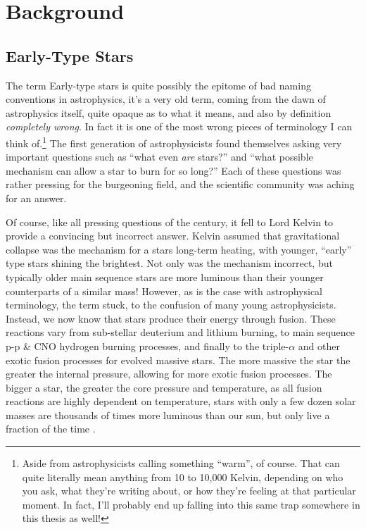 \chapter{Background}

\section{Early-Type Stars}
\label{sec:earlytype}
\label{sec:obtype}

The term Early-type stars is quite possibly the epitome of bad naming conventions in astrophysics, it's a very old term, coming from the dawn of astrophysics itself, quite opaque as to what it means, and also by definition \textit{completely wrong}. In fact it is one of the most wrong pieces of terminology I can think of.\footnote{Aside from astrophysicists calling something ``warm'', of course. That can quite literally mean anything from 10 to 10,000 Kelvin, depending on who you ask, what they're writing about, or how they're feeling at that particular moment. In fact, I'll probably end up falling into this same trap somewhere in this thesis as well!}
The first generation of astrophysicists found themselves asking very important questions such as ``what even \textit{are} stars?'' and ``what possible mechanism can allow a star to burn for so long?'' Each of these questions was rather pressing for the burgeoning field, and the scientific community was aching for an answer.

Of course, like all pressing questions of the  century, it fell to Lord Kelvin to provide a convincing but incorrect answer. Kelvin assumed that gravitational collapse was the mechanism for a stars long-term heating, with younger, ``early'' type stars shining the brightest. Not only was the mechanism incorrect, but typically older main sequence stars are more luminous than their younger counterparts of a similar mass! However, as is the case with astrophysical terminology, the term stuck, to the confusion of many young astrophysicists.
Instead, we now know that stars produce their energy through fusion. These reactions vary from sub-stellar deuterium and lithium burning, to main sequence p-p \& CNO hydrogen burning processes, and finally to the triple-$\alpha$ and other exotic fusion processes for evolved massive stars. The more massive the star the greater the internal pressure, allowing for more exotic fusion processes.
The bigger a star, the greater the core pressure and temperature, as all fusion reactions are highly dependent on temperature, stars with only a few dozen solar masses are thousands of times more luminous than our sun, but only live a fraction of the time \parencite{carrollIntroductionModernAstrophysics2014}.

